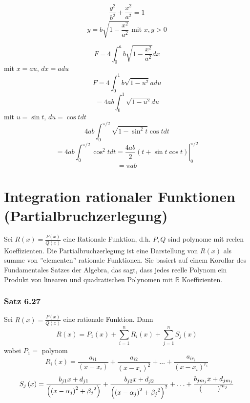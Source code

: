 \begin{enumerate}
\begin{figure}[ht]
\begin{minipage}[b]{0.45\linewidth}
\centering
{}

\end{minipage}
\hspace{0.5cm}
\begin{minipage}[b]{0.45\linewidth}

\centering
$$\frac{y^2}{b^2}+\frac{x^2}{a^2}=1$$
$$y=b\sqrt{1-\frac{x^2}{a^2}}\text{ mit }x,y>0$$

\end{minipage}
\end{figure}
$$F=4\int ^{a}_{0}b\sqrt {1-\dfrac {x^{2}}{a^{2}}}dx$$
mit $x=au$, $dx=adu$ $$F=4\int ^{1}_{0}b\sqrt {1-u^2}adu$$$$=4ab\int ^{1}_{0}\sqrt {1-u^2}du$$ mit $u=\sin t$, $du=\cos tdt$
$$4ab\int ^{\pi /2}_{0}\sqrt {1-\sin^2t}\cos t dt$$$$=4ab\int ^{\pi /2}_{0}\cos ^{2}tdt=\left.\frac{4ab}{2}\left( t+\sin t\cos t\right) \right| ^{\pi /2}_{0}$$$$=\pi ab$$
\end{enumerate}  
\section{Integration rationaler Funktionen (Partialbruchzerlegung)}
Sei $R(x)=\frac{P(x)}{Q(x)}$ eine Rationale Funktion, d.h. $P,Q$ sind polynome mit reelen Koeffizienten. Die Partialbruchzerlegung ist eine Darstellung von $R(x)$ als summe von ''elementen'' rationale Funktionen. Sie basiert auf einem Korollar des Fundamentales Satzes der Algebra, das sagt, dass jedes reelle Polynom ein Produkt von linearen und quadratischen Polynomen mit $\mathbb{R}$ Koeffizienten. 

\subsubsection*{Satz 6.27}
Sei $R(x)=\frac{P(x)}{Q(x)}$ eine rationale Funktion. Dann $$R(x)=P_1(x)+\sum ^{n}_{i=1}R_{i}\left( x\right) +\sum ^{n}_{j=1}S_{j}\left( x\right) $$ wobei $P_1=$ polynom $$R_{i}\left( x\right) =\dfrac {a_{i1}}{\left( x-x_{i}\right) }+\dfrac {a_{i2}}{\left( x-x_{i}\right) ^{2}}+\ldots +\dfrac {a_{ir_{i}}}{{\left( x-x_{i}\right)}^{r_i} }$$  $$S_{j}\left( x\right) =\dfrac {b_{j1}x+{d_{j1}}}{\left( \left(x-\alpha_{j}\right)^2+{\beta_{j}}^2\right) }+\dfrac {b_{j2}x+{d_{j2}}}{\left( \left(x-\alpha_{j}\right)^2+{\beta_{j}}^2\right)^2 }+\ldots +\dfrac {b_{j m_j}x+{d_{j m_j}}}{\left( \text{\hspace{8mm}}\right)^{m_j} }$$

